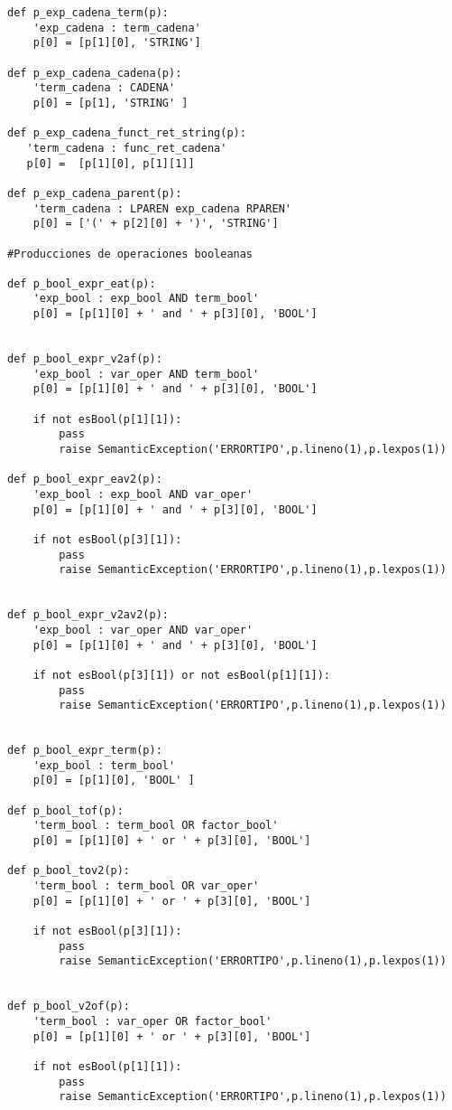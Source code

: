 \begin{verbatim}
def p_exp_cadena_term(p):
    'exp_cadena : term_cadena'
    p[0] = [p[1][0], 'STRING']

def p_exp_cadena_cadena(p):
    'term_cadena : CADENA'
    p[0] = [p[1], 'STRING' ]

def p_exp_cadena_funct_ret_string(p):
   'term_cadena : func_ret_cadena'
   p[0] =  [p[1][0], p[1][1]] 

def p_exp_cadena_parent(p):
    'term_cadena : LPAREN exp_cadena RPAREN'
    p[0] = ['(' + p[2][0] + ')', 'STRING']

#Producciones de operaciones booleanas

def p_bool_expr_eat(p):
    'exp_bool : exp_bool AND term_bool'
    p[0] = [p[1][0] + ' and ' + p[3][0], 'BOOL']


def p_bool_expr_v2af(p):
    'exp_bool : var_oper AND term_bool'
    p[0] = [p[1][0] + ' and ' + p[3][0], 'BOOL']

    if not esBool(p[1][1]):
        pass
        raise SemanticException('ERRORTIPO',p.lineno(1),p.lexpos(1))

def p_bool_expr_eav2(p):
    'exp_bool : exp_bool AND var_oper'
    p[0] = [p[1][0] + ' and ' + p[3][0], 'BOOL']

    if not esBool(p[3][1]):
        pass
        raise SemanticException('ERRORTIPO',p.lineno(1),p.lexpos(1))


def p_bool_expr_v2av2(p):
    'exp_bool : var_oper AND var_oper'
    p[0] = [p[1][0] + ' and ' + p[3][0], 'BOOL']

    if not esBool(p[3][1]) or not esBool(p[1][1]):
        pass
        raise SemanticException('ERRORTIPO',p.lineno(1),p.lexpos(1))


def p_bool_expr_term(p):
    'exp_bool : term_bool'
    p[0] = [p[1][0], 'BOOL' ]

def p_bool_tof(p):
    'term_bool : term_bool OR factor_bool'
    p[0] = [p[1][0] + ' or ' + p[3][0], 'BOOL']

def p_bool_tov2(p):
    'term_bool : term_bool OR var_oper'
    p[0] = [p[1][0] + ' or ' + p[3][0], 'BOOL']

    if not esBool(p[3][1]):
        pass
        raise SemanticException('ERRORTIPO',p.lineno(1),p.lexpos(1))


def p_bool_v2of(p):
    'term_bool : var_oper OR factor_bool'
    p[0] = [p[1][0] + ' or ' + p[3][0], 'BOOL']

    if not esBool(p[1][1]):
        pass
        raise SemanticException('ERRORTIPO',p.lineno(1),p.lexpos(1))



\end{verbatim}
